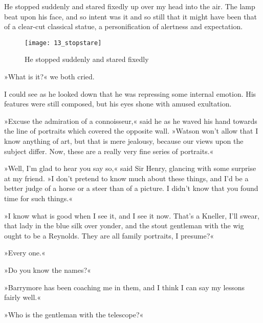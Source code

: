 He stopped suddenly and stared fixedly up over my head into the air. The lamp beat upon his face, and so intent was it and so still that it might have been that of a clear-cut classical statue, a personification of alertness and expectation.

\begin{figure}[tbph]
\centering
\texttt{[image: 13\_stopstare]}
\caption{He stopped suddenly and stared fixedly}
\end{figure}

»What is it?« we both cried.

I could see as he looked down that he was repressing some internal emotion. His features were still composed, but his eyes shone with amused exultation.

»Excuse the admiration of a connoisseur,« said he as he waved his hand towards the line of portraits which covered the opposite wall. »Watson won't allow that I know anything of art, but that is mere jealousy, because our views upon the subject differ. Now, these are a really very fine series of portraits.«

»Well, I'm glad to hear you say so,« said Sir Henry, glancing with some surprise at my friend. »I don't pretend to know much about these things, and I'd be a better judge of a horse or a steer than of a picture. I didn't know that you found time for such things.«


»I know what is good when I see it, and I see it now. That's a Kneller, I'll swear, that lady in the blue silk over yonder, and the stout gentleman with the wig ought to be a Reynolds. They are all family portraits, I presume?«


»Every one.«

»Do you know the names?«

»Barrymore has been coaching me in them, and I think I can say my lessons fairly well.«

»Who is the gentleman with the telescope?«


